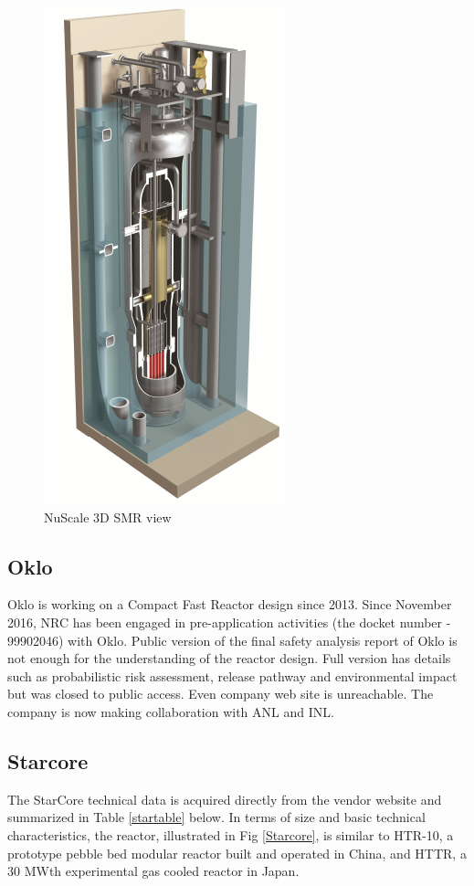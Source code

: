 \documentclass[10pt,a4paper]{article}
\begin{document}
\begin{figure}[htbp]
\centering
\includegraphics[scale=0.8]{Figs/nuscale3d.jpeg}
\caption{NuScale 3D SMR view}
\label{Nu3d}
\end{figure}

\pagebreak
\subsection{Oklo}
Oklo is working on a Compact Fast Reactor design since 2013. Since November 2016, NRC has been engaged in pre-application activities (the docket number - 99902046) with Oklo. Public version of the final safety analysis report of Oklo \cite{oklo_inc._pilot_2018} is not enough for the understanding of the reactor design. Full version has details such as probabilistic risk assessment, release pathway and environmental impact but was closed to public access. Even company web site is unreachable. The company is now making collaboration with ANL and INL. 

\subsection{Starcore}
The StarCore technical data is acquired directly from the vendor website and summarized in Table \ref{startable} below. In terms of size and basic technical characteristics, the reactor, illustrated in Fig \ref{Starcore}, is similar to HTR-10, a prototype pebble bed modular reactor built and operated in China, and HTTR, a 30 MWth experimental gas cooled reactor in Japan.
\end{document}
